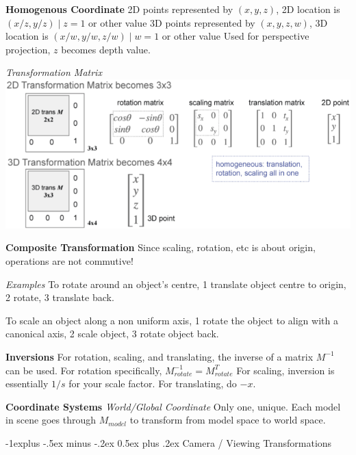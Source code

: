 \documentclass[letterpaper, 8pt]{extarticle}
\makeatletter
\renewcommand{\section}{\@startsection{section}{1}{0mm}%
                                {-1explus -.5ex minus -.2ex}%
                                {0.5ex plus .2ex}%
                                {\normalfont\small\bfseries}}
\makeatother
\begin{document}
\begin{multicols*}{4}

    \textbf{Homogenous Coordinate}
    2D points represented by \((x, y, z)\), 2D location is \((x/z, y/z) \mid z=1\) or other value
    3D points represented by \((x, y, z, w)\), 3D location is \((x/w, y/w, z/w) \mid w=1\) or other value
    Used for perspective projection, \(z\) becomes depth value.

    \textit{Transformation Matrix}
    \includegraphics[width=\linewidth]{homogenous-coord-transformation-matrix.png}

    \textbf{Composite Transformation}
    Since scaling, rotation, etc is about origin, operations are not commutive!

    \textit{Examples}
    To rotate around an object's centre, 1 translate object centre to origin, 2 rotate, 3 translate back.

    To scale an object along a non uniform axis, 1 rotate the object to align with a canonical axis, 2 scale object, 3 rotate object back.

    \textbf{Inversions}
    For rotation, scaling, and translating,
    the inverse of a matrix \(M^{-1}\) can be used.
    For rotation specifically, \(M^{-1}_{rotate}=M^T_{rotate}\)
    For scaling, inversion is essentially \(1/s\) for your scale factor.
    For translating, do \(-x\).

    \textbf{Coordinate Systems}
    \textit{World/Global Coordinate}
    Only one, unique.
    Each model in scene goes through \(M_{model}\) to transform from model space to world space.

    \section{Camera / Viewing Transformations}


\end{multicols*}
\end{document}
